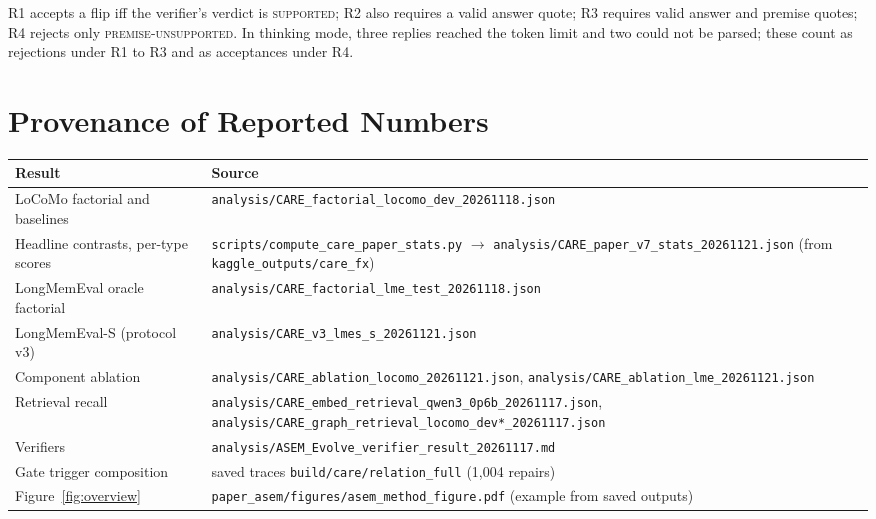 \documentclass[10pt]{article}
\theoremstyle{plain}
\begin{document}
R1 accepts a flip iff the verifier's verdict is \textsc{supported}; R2 also requires a valid answer quote; R3
requires valid answer and premise quotes; R4 rejects only \textsc{premise-unsupported}. In thinking mode, three
replies reached the token limit and two could not be parsed; these count as rejections under R1 to R3 and as
acceptances under R4.

\section{Provenance of Reported Numbers}
\label{app:provenance}

{\footnotesize
\begin{tabular}{>{\raggedright\arraybackslash}p{4.0cm}>{\raggedright\arraybackslash}p{11.5cm}}
\toprule
Result & Source \\
\midrule
LoCoMo factorial and baselines & \texttt{analysis/\allowbreak CARE\_factorial\_locomo\_dev\_20261118.json} \\
Headline contrasts, per-type scores & \texttt{scripts/\allowbreak compute\_care\_paper\_stats.py} $\to$ \texttt{analysis/\allowbreak CARE\_paper\_v7\_stats\_20261121.json} (from \texttt{kaggle\_outputs/\allowbreak care\_fx}) \\
LongMemEval oracle factorial & \texttt{analysis/\allowbreak CARE\_factorial\_lme\_test\_20261118.json} \\
LongMemEval-S (protocol v3) & \texttt{analysis/\allowbreak CARE\_v3\_lmes\_s\_20261121.json} \\
Component ablation & \texttt{analysis/\allowbreak CARE\_ablation\_locomo\_20261121.json}, \texttt{analysis/\allowbreak CARE\_ablation\_lme\_20261121.json} \\
Retrieval recall & \texttt{analysis/\allowbreak CARE\_embed\_retrieval\_qwen3\_0p6b\_20261117.json}, \texttt{analysis/\allowbreak CARE\_graph\_retrieval\_locomo\_dev*\_20261117.json} \\
Verifiers & \texttt{analysis/\allowbreak ASEM\_Evolve\_verifier\_result\_20261117.md} \\
Gate trigger composition & saved traces \texttt{build/care/relation\_full} (1,004 repairs) \\
Figure~\ref{fig:overview} & \texttt{paper\_asem/figures/\allowbreak asem\_method\_figure.pdf} (example from saved outputs) \\
\bottomrule
\end{tabular}}
\end{document}
